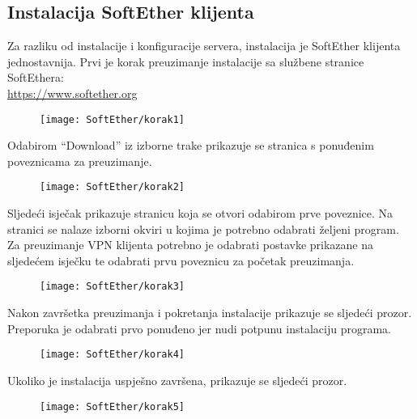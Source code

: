 \subsection*{Instalacija SoftEther klijenta}
\hspace{0.5cm}
Za razliku od instalacije i konfiguracije servera, instalacija je SoftEther klijenta jednostavnija. Prvi je korak preuzimanje instalacije sa službene stranice SoftEthera:\\ \url{https://www.softether.org}
\begin{figure}[h!]
	\centering
     \texttt{[image: SoftEther/korak1]}
\end{figure}
\FloatBarrier
Odabirom ``Download'' iz izborne trake prikazuje se stranica s ponuđenim poveznicama za preuzimanje.
\begin{figure}[h!]
     \centering
     \texttt{[image: SoftEther/korak2]}
\end{figure}
\FloatBarrier
Sljedeći isječak prikazuje stranicu koja se otvori odabirom prve poveznice. Na stranici se nalaze izborni okviri u kojima je potrebno odabrati željeni program. Za preuzimanje VPN klijenta potrebno je odabrati postavke prikazane na sljedećem isječku te odabrati prvu poveznicu za početak preuzimanja.
\begin{figure}[h!]
     \centering
     \texttt{[image: SoftEther/korak3]}
\end{figure}
\FloatBarrier
Nakon završetka preuzimanja i pokretanja instalacije prikazuje se sljedeći prozor. Preporuka je odabrati prvo ponuđeno jer nudi potpunu instalaciju programa.
\begin{figure}[h!]
     \centering
     \texttt{[image: SoftEther/korak4]}
\end{figure}
\FloatBarrier
Ukoliko je instalacija uspješno završena, prikazuje se sljedeći prozor.
\begin{figure}[h!]
     \centering
     \texttt{[image: SoftEther/korak5]}
\end{figure}
\FloatBarrier

\newpage
